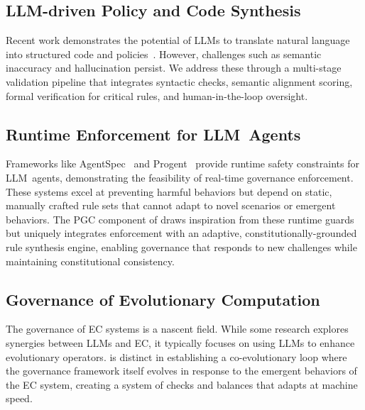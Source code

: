 \subsection{LLM-driven Policy and Code Synthesis}
Recent work demonstrates the potential of LLMs to translate natural language into structured code and policies~\cite{propertygpt2023, veriplan2023}. However, challenges such as semantic inaccuracy and hallucination persist. We address these through a multi-stage validation pipeline that integrates syntactic checks, semantic alignment scoring, formal verification for critical rules, and human-in-the-loop oversight.

\subsection{Runtime Enforcement for LLM\allowbreak~Agents}
Frameworks like AgentSpec~\cite{agentspec2023} and Progent~\cite{progent2023} provide runtime safety constraints for LLM~agents, demonstrating the feasibility of real-time governance enforcement. These systems excel at preventing harmful behaviors but depend on static, manually crafted rule sets that cannot adapt to novel scenarios or emergent behaviors. The PGC component of \acgs{} draws inspiration from these runtime guards but uniquely integrates enforcement with an adaptive, constitutionally-grounded rule synthesis engine, enabling governance that responds to new challenges while maintaining constitutional consistency.

\subsection{Governance of Evolutionary Computation}
The governance of EC systems is a nascent field. While some research explores synergies between LLMs and EC, it typically focuses on using LLMs to enhance evolutionary operators. \acgs{} is distinct in establishing a co-evolutionary loop where the governance framework itself evolves in response to the emergent behaviors of the EC system, creating a system of checks and balances that adapts at machine speed.
